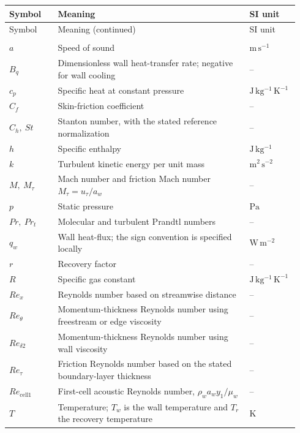 \begin{longtable}{@{}p{0.16\linewidth}p{0.63\linewidth}p{0.15\linewidth}@{}}
\toprule
Symbol & Meaning & SI unit \\
\midrule
\endfirsthead
\toprule
Symbol & Meaning (continued) & SI unit \\
\midrule
\endhead
\bottomrule
\endlastfoot
\multicolumn{3}{@{}l}{\textbf{Latin symbols}} \\[2pt]
\(a\) & Speed of sound & \(\mathrm{m\,s^{-1}}\) \\
\(B_q\) & Dimensionless wall heat-transfer rate; negative for wall cooling & -- \\
\(c_p\) & Specific heat at constant pressure & \(\mathrm{J\,kg^{-1}\,K^{-1}}\) \\
\(C_f\) & Skin-friction coefficient & -- \\
\(C_h,\ St\) & Stanton number, with the stated reference normalization & -- \\
\(h\) & Specific enthalpy & \(\mathrm{J\,kg^{-1}}\) \\
\(k\) & Turbulent kinetic energy per unit mass & \(\mathrm{m^2\,s^{-2}}\) \\
\(M,\ M_\tau\) & Mach number and friction Mach number \(M_\tau=u_\tau/a_w\) & -- \\
\(p\) & Static pressure & \(\mathrm{Pa}\) \\
\(Pr,\ Pr_t\) & Molecular and turbulent Prandtl numbers & -- \\
\(q_w\) & Wall heat-flux; the sign convention is specified locally & \(\mathrm{W\,m^{-2}}\) \\
\(r\) & Recovery factor & -- \\
\(R\) & Specific gas constant & \(\mathrm{J\,kg^{-1}\,K^{-1}}\) \\
\(Re_x\) & Reynolds number based on streamwise distance & -- \\
\(Re_\theta\) & Momentum-thickness Reynolds number using freestream or edge viscosity & -- \\
\(Re_{\delta2}\) & Momentum-thickness Reynolds number using wall viscosity & -- \\
\(Re_\tau\) & Friction Reynolds number based on the stated boundary-layer thickness & -- \\
\(Re_{\mathrm{cell1}}\) & First-cell acoustic Reynolds number, \(\rho_w a_w y_1/\mu_w\) & -- \\
\(T\) & Temperature; \(T_w\) is the wall temperature and \(T_r\) the recovery temperature & \(\mathrm{K}\) \\

\end{longtable}
